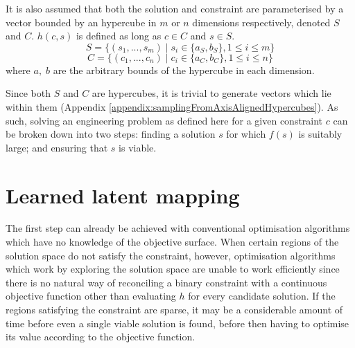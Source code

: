 \documentclass[../../main.tex]{subfiles}
\begin{document}
It is also assumed that both the solution and constraint are parameterised by a vector bounded by an hypercube in $m$ or $n$ dimensions respectively, denoted $S$ and $C$.
$h(c,s)$ is defined as long as $c\in C$ and $s\in S$.
\begin{equation}
    S=\{(s_1,...,s_m)\;|\;s_i\in\{a_S,b_S\},1\le i\le m\}
\end{equation}
\begin{equation}
    C=\{(c_1,...,c_n)\;|\;c_i\in\{a_C,b_C\},1\le i\le n\}
\end{equation}
where $a,\;b$ are the arbitrary bounds of the hypercube in each dimension.

Since both $S$ and $C$ are hypercubes, it is trivial to generate vectors which lie within them (Appendix \ref{appendix:samplingFromAxisAlignedHypercubes}).
As such, solving an engineering problem as defined here for a given constraint $c$ can be broken down into two steps: finding a solution $s$ for which $f(s)$ is suitably large; and ensuring that $s$ is viable.

\section{Learned latent mapping} \label{section:learnedLatentMapping}

The first step can already be achieved with conventional optimisation algorithms which have no knowledge of the objective surface.
When certain regions of the solution space do not satisfy the constraint, however, optimisation algorithms which work by exploring the solution space are unable to work efficiently since there is no natural way of reconciling a binary constraint with a continuous objective function other than evaluating $h$ for every candidate solution.
If the regions satisfying the constraint are sparse, it may be a considerable amount of time before even a single viable solution is found, before then having to optimise its value according to the objective function.
\end{document}

